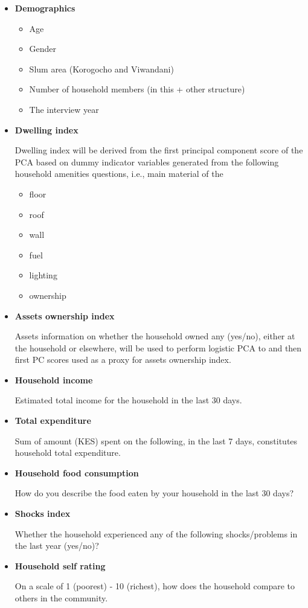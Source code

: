 \begin{itemize}
\item \textbf{Demographics}
\begin{itemize}
\item Age
\item Gender
\item Slum area (Korogocho and Viwandani)
\item  Number of household members (in this + other structure)
\item The interview year
\end{itemize}
\item \textbf{Dwelling index}

Dwelling index will be derived from the first principal component score of the PCA based on dummy indicator variables generated from the following household amenities questions, i.e., main material of the
\begin{itemize}
\item floor
\item roof
\item wall
\item fuel
\item lighting
\item ownership
\end{itemize}
\item \textbf{Assets ownership index}

Assets information on whether the household owned any (yes/no), either at the household or elsewhere, will be used to perform logistic PCA to and then first PC scores used as a proxy for assets ownership index.
\item \textbf{Household income}

Estimated total income for the household in the last 30 days.
\item \textbf{Total expenditure}

Sum of amount (KES) spent on the following, in the last 7 days, constitutes household total expenditure.
\item \textbf{Household food consumption}

How do you describe the food eaten by your household in the last 30 days?
\item \textbf{Shocks index}

Whether the household experienced any of the following shocks/problems in the last year (yes/no)?

\item \textbf{Household self rating}

On a scale of 1 (poorest) - 10 (richest), how does the household compare to others in the community.

\end{itemize}

